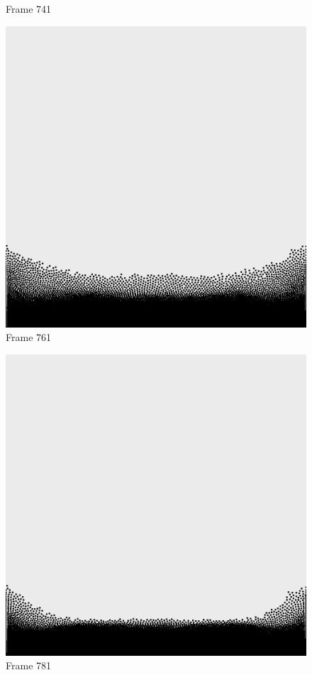 \documentclass[a4paper, 12pt, oneside]{book}
\begin{document}
\begin{figure}[!ht]
\begin{center}
            Frame 741
        \end{center}
    \endminipage
    \hfill
        \begin{center}
            \includegraphics[width=\linewidth]{images/test_case_1/761.png}
            Frame 761
        \end{center}
    \endminipage
    \hfill
        \begin{center}
            \includegraphics[width=\linewidth]{images/test_case_1/781.png}
            Frame 781
        \end{center}
    \endminipage
    \hfill
\end{figure}
\end{document}
